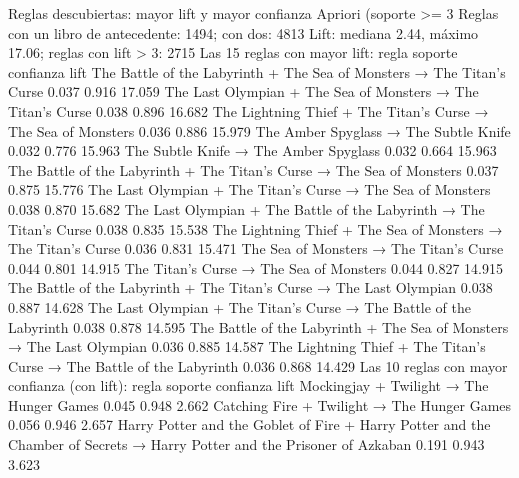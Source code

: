 \documentclass[11pt,letterpaper]{article}
\begin{document}
\begin{consola}[label=out:reglas]{Reglas descubiertas: mayor lift y mayor confianza}
Apriori (soporte >= 3%
Reglas con un libro de antecedente: 1494; con dos: 4813
Lift: mediana 2.44, máximo 17.06; reglas con lift > 3: 2715
Las 15 reglas con mayor lift:
                                                                regla  soporte  confianza   lift
The Battle of the Labyrinth + The Sea of Monsters → The Titan's Curse    0.037      0.916 17.059
          The Last Olympian + The Sea of Monsters → The Titan's Curse    0.038      0.896 16.682
        The Lightning Thief + The Titan's Curse → The Sea of Monsters    0.036      0.886 15.979
                                The Amber Spyglass → The Subtle Knife    0.032      0.776 15.963
                                The Subtle Knife → The Amber Spyglass    0.032      0.664 15.963
The Battle of the Labyrinth + The Titan's Curse → The Sea of Monsters    0.037      0.875 15.776
          The Last Olympian + The Titan's Curse → The Sea of Monsters    0.038      0.870 15.682
  The Last Olympian + The Battle of the Labyrinth → The Titan's Curse    0.038      0.835 15.538
        The Lightning Thief + The Sea of Monsters → The Titan's Curse    0.036      0.831 15.471
                              The Sea of Monsters → The Titan's Curse    0.044      0.801 14.915
                              The Titan's Curse → The Sea of Monsters    0.044      0.827 14.915
  The Battle of the Labyrinth + The Titan's Curse → The Last Olympian    0.038      0.887 14.628
  The Last Olympian + The Titan's Curse → The Battle of the Labyrinth    0.038      0.878 14.595
The Battle of the Labyrinth + The Sea of Monsters → The Last Olympian    0.036      0.885 14.587
The Lightning Thief + The Titan's Curse → The Battle of the Labyrinth    0.036      0.868 14.429
Las 10 reglas con mayor confianza (con lift):
                                                                                                                         regla  soporte  confianza  lift
                                                                                      Mockingjay + Twilight → The Hunger Games    0.045      0.948 2.662
                                                                                   Catching Fire + Twilight → The Hunger Games    0.056      0.946 2.657
      Harry Potter and the Goblet of Fire + Harry Potter and the Chamber of Secrets → Harry Potter and the Prisoner of Azkaban    0.191      0.943 3.623

\end{consola}
\end{document}
